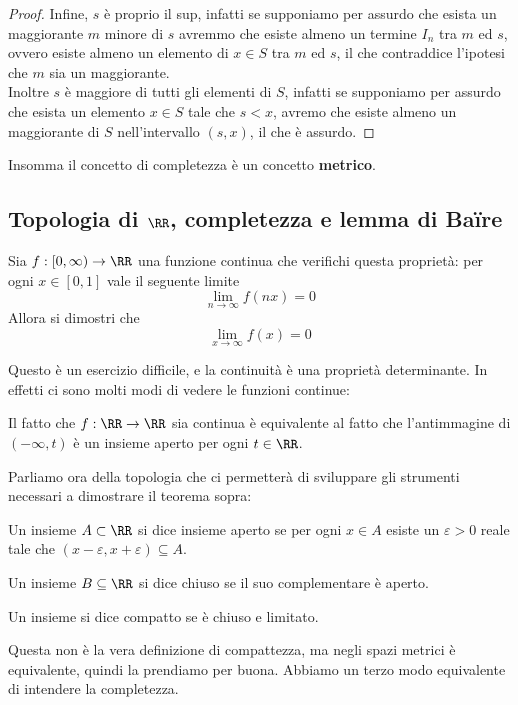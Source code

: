 \documentclass[11pt]{scrartcl}
\begin{document}
\begin{proof}
		Infine, $s$ è proprio il sup, infatti se supponiamo per assurdo che esista un maggiorante $m$ minore di $s$ avremmo che esiste almeno un termine $I_n$ tra $m$ ed $s$, ovvero esiste almeno un elemento di $x\in S$ tra $m$ ed $s$, il che contraddice l'ipotesi che $m$ sia un maggiorante. \\
		Inoltre $s$ è maggiore di tutti gli elementi di $S$, infatti se supponiamo per assurdo che esista un elemento $x\in S$ tale che $s<x$, avremo che esiste almeno un maggiorante di $S$ nell'intervallo $(s,x)$, il che è assurdo.
	\end{proof}
	Insomma il concetto di completezza è un concetto \textbf{metrico}.
	\subsection{Topologia di $\RR$, completezza e lemma di Ba{\"i}re}
	\begin{example}\label{problema con baire}
		Sia $f:[0,\infty)\to \RR$ una funzione continua che verifichi questa proprietà: per ogni $x\in[0,1]$ vale il seguente limite
		$$\lim_{n\to\infty}f(nx)=0$$
		Allora si dimostri che
		$$\lim_{x\to\infty}f(x)=0$$
 	\end{example}
 	Questo è un esercizio difficile, e la continuità è una proprietà determinante. In effetti ci sono molti modi di vedere le funzioni continue:
 	\begin{lemma}
 		Il fatto che $f:\RR\to\RR$ sia continua è equivalente al fatto che l'antimmagine di $(-\infty,t)$ è un insieme aperto per ogni $t\in\RR$.
 	\end{lemma}
 	Parliamo ora della topologia che ci permetterà di sviluppare gli strumenti necessari a dimostrare il teorema sopra:
 	\begin{definition}
 		Un insieme $A\subset \RR$ si dice insieme aperto se per ogni $x\in A$ esiste un $\varepsilon>0$ reale tale che $(x-\varepsilon,x+\varepsilon)\subseteq A$.
 	\end{definition}
 	\begin{definition}
 		Un insieme $B\subseteq \RR$ si dice chiuso se il suo complementare è aperto.
 	\end{definition}
 	\begin{definition}
 		Un insieme si dice compatto se è chiuso e limitato.
 	\end{definition}
 	Questa non è la vera definizione di compattezza, ma negli spazi metrici è equivalente, quindi la prendiamo per buona. Abbiamo un terzo modo equivalente di intendere la completezza.
\end{document}
